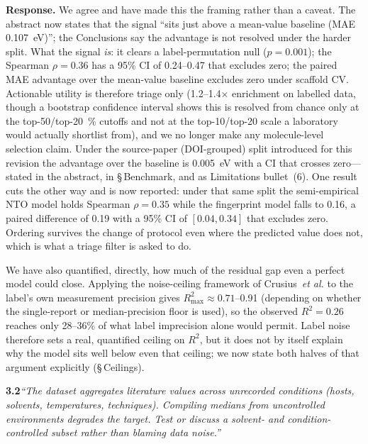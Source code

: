 \documentclass[12pt,a4paper]{letter}
\begin{document}
\smallskip
\noindent\textbf{Response.}
We agree and have made this the framing rather than a caveat. The abstract now
states that the signal ``sits just above a mean-value baseline (MAE
\num{0.107}~eV)''; the Conclusions say the advantage is not resolved under the
harder split. What the signal \emph{is}: it clears a label-permutation null
($p = 0.001$); the Spearman $\rho = 0.36$ has a \num{95}\% CI of
\numrange{0.24}{0.47} that excludes zero; the paired MAE advantage over the
mean-value baseline excludes zero under scaffold CV. Actionable utility is
therefore triage only (\num{1.2}--\num{1.4}$\times$ enrichment on labelled data,
though a bootstrap confidence interval shows this is resolved from chance only at
the top-\num{50}/top-\qty{20}{\percent} cutoffs and not at the top-\num{10}/top-\num{20} scale a
laboratory would actually shortlist from),
and we no longer make any molecule-level selection claim. Under the source-paper
(DOI-grouped) split introduced for this revision the advantage over the baseline
is \num{0.005}~eV with a CI that crosses zero---stated in the abstract, in
\S\,Benchmark, and as Limitations bullet~(6). One result cuts the other way and is now
reported: under that same split the semi-empirical NTO model holds Spearman
$\rho = \num{0.35}$ while the fingerprint model falls to \num{0.16}, a paired
difference of \num{0.19} with a \num{95}\% CI of $[0.04, 0.34]$ that excludes zero.
Ordering survives the change of protocol even where the predicted value does not, which
is what a triage filter is asked to do.

We have also quantified, directly, how much of the residual gap even a perfect
model could close. Applying the noise-ceiling framework of
Crusius~\textit{et al.} to the label's own measurement precision gives
$R^2_\text{max} \approx 0.71$--\num{0.91} (depending on whether the single-report
or median-precision floor is used), so the observed $R^2 = 0.26$ reaches only
\num{28}--\num{36}\% of what label imprecision alone would permit. Label noise
therefore sets a real, quantified ceiling on $R^2$, but it does not by itself
explain why the model sits well below even that ceiling; we now state both
halves of that argument explicitly (\S\,Ceilings).

\medskip
\noindent\textbf{3.2}\quad\textit{``The dataset aggregates literature values
across unrecorded conditions (hosts, solvents, temperatures, techniques).
Compiling medians from uncontrolled environments degrades the target. Test or
discuss a solvent- and condition-controlled subset rather than blaming data
noise.''}
\end{document}
